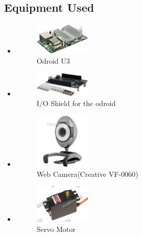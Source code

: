 \documentclass[12pt,a4paper]{article}
\begin{document}
    \subsection{Equipment Used}
      \begin{itemize}
        \item
          \begin{figure}[h!]
            \centering
            \caption{Odroid U3}
            \includegraphics[width=0.25\textwidth]{odroid}
          \end{figure}
        \item
          \begin{figure}[h!]
            \centering
            \caption{I/O Shield for the odroid}
            \includegraphics[width=0.25\textwidth]{ioshield}
          \end{figure}
        \item
          \begin{figure}[h!]
            \centering
            \caption{Web Camera(Creative VF-0060)}
            \includegraphics[width=0.25\textwidth]{webcam}
          \end{figure}
        \item
          \begin{figure}[h!]
            \centering
            \caption{Servo Motor}
            \includegraphics[width=0.25\textwidth]{servo}
          \end{figure}
      \end{itemize}
      \clearpage
\end{document}
